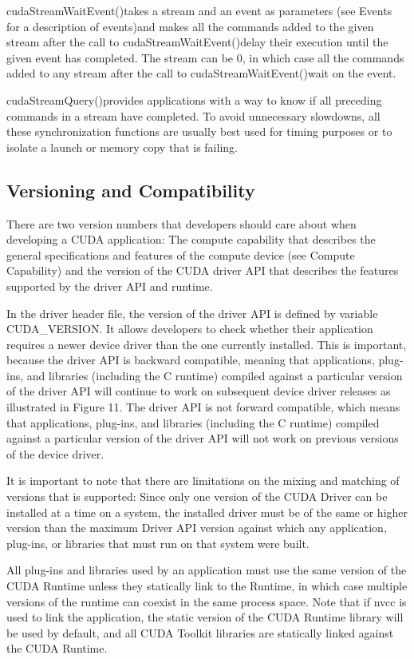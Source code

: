 cudaStreamWaitEvent()takes a stream and an event as parameters (see Events 
for a description of events)and makes all the commands added to the given 
stream after the call to cudaStreamWaitEvent()delay their execution until the 
given event has completed. The stream can be 0, in which case all the commands 
added to any stream after the call to cudaStreamWaitEvent()wait on the event.

cudaStreamQuery()provides applications with a way to know if all preceding 
commands in a stream have completed. To avoid unnecessary slowdowns, all these 
synchronization functions are usually best used for timing purposes or to 
isolate a launch or memory copy that is failing.
%
\subsection{Versioning and Compatibility}%
There are two version numbers that developers should care about when developing 
a CUDA application: The compute capability that describes the general 
specifications and features of the compute device (see Compute Capability) and 
the version of the CUDA driver API that describes the features supported by the 
driver API and runtime.

In the driver header file, the version of the driver API is defined by variable CUDA\_VERSION. It allows developers to check whether their application requires a newer device driver than the one currently installed. This is important, because the driver API is backward compatible, meaning that applications, plug-ins, and libraries (including the C runtime) compiled against a particular version of the driver API will continue to work on subsequent device driver releases as illustrated in Figure 11. The driver API is not forward compatible, which means that applications, plug-ins, and libraries (including the C runtime) compiled against a particular version of the driver API will not work on previous versions of the device driver.

It is important to note that there are limitations on the mixing and matching of versions that is supported: Since only one version of the CUDA Driver can be installed at a time on a system, the installed driver must be of the same or higher version than the maximum Driver API version against which any application, plug-ins, or libraries that must run on that system were built.

All plug-ins and libraries used by an application must use the same version of 
the CUDA Runtime unless they statically link to the Runtime, in which case 
multiple versions of the runtime can coexist in the same process space. Note 
that if nvcc is used to link the application, the static version of the CUDA 
Runtime library will be used by default, and all CUDA Toolkit libraries are 
statically linked against the CUDA Runtime.

